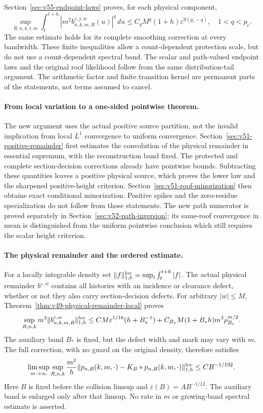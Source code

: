 Section~\ref{sec:v55-endpoint-laws} proves, for each physical component,
\[
 \sup_{R,n,k,t,m}\int_t^{t+h}
 |m^2b^{\varepsilon,j,w}_{n,k,m,R}(u)|^q\,du
 \le C_qM^q(1+h)\varepsilon^{9(p_c-q)},\quad 1<q<p_c.
\]
The same estimate holds for its complete smoothing correction at every
bandwidth. These finite inequalities allow a count-dependent protection
scale, but do not use a count-dependent spectral band. The scalar and
path-valued endpoint laws and the original roof likelihood follow from
the same distribution-tail argument. The arithmetic factor and finite
transition kernel are permanent parts of the statements, not terms
assumed to cancel.

\paragraph{From local variation to a one-sided pointwise theorem.}
The new argument uses the actual positive source partition, not the
invalid implication from local $L^1$ convergence to uniform convergence.
Section~\ref{sec:v51-positive-remainder} first estimates the convolution
of the physical remainder in essential supremum, with the reconstruction
band fixed. The protected and complete section-decision corrections
already have pointwise bounds. Subtracting these quantities leaves a
positive physical source, which proves the lower law and the sharpened
positive-height criterion. Section~\ref{sec:v51-roof-minorization}
then obtains exact conditional minorization. Positive spikes and the zero-residue specialization do not follow
from those statements. The new path numerator is proved separately in
Section~\ref{sec:v52-path-inversion}; its same-roof convergence in mean
is distinguished from the uniform pointwise conclusion which still
requires the scalar height criterion.

\paragraph{The physical remainder and the ordered estimate.}
For a locally integrable density set
$\|f\|_{1,h}^{\rm loc}=\sup_t\int_t^{t+h}|f|$.
The actual physical remainder $b^{\varepsilon,w}$ contains all
histories with an incidence or clearance defect, whether or not they
also carry section-decision defects. For arbitrary $|w|\le M$,
Theorem~\ref{thm:v49-physical-remainder-local} proves
\[
 \sup_{R,n,k}m^2\|b^{\varepsilon,w}_{n,k,m,R}\|_{1,h}^{\rm loc}
 \le CM\varepsilon^{1/16}(h+B_*^{-1})
       +C_{B_*}M(1+B_*h)m^3\rho_{B_*}^{m/2}.
\]
The auxiliary band $B_*$ is fixed, but the defect width and mark may
vary with $m$. The full correction, with no guard on the original
density, therefore satisfies
\[
 \limsup_{m\to\infty}\sup_{R,n,k}
 \frac{m^2}{h}\|p_{n,R}(k,m,\cdot)-K_B*p_{n,R}(k,m,\cdot)\|_{1,h}^{\rm loc}
                         \le CB^{-1/192}.
\]
Here $B$ is fixed before the collision limsup and
$\varepsilon(B)=AB^{-1/12}$. The auxiliary band is enlarged only
after that limsup. No rate in $m$ or growing-band spectral estimate
is asserted.

